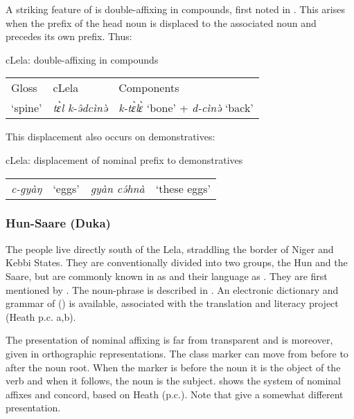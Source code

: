 \documentclass[output=paper]{langsci/langscibook}
\begin{document}
A striking feature of  is double-affixing in compounds, first noted in \citet{Hoffmann1967}. This arises when the prefix of the head noun is displaced to the associated noun and precedes its own prefix. Thus:

\ea
{cLela: double-affixing in compounds}\\
\begin{tabular}{lll}
{Gloss}	& {cLela}	& {Components}\\
‘spine’	& \textit{tɛ̀l k-ə̂dcìnə̀}	& \textit{k-tɛ̀lɛ̀} ‘bone’ + \textit{d-cìnə̀} ‘back’\\
\end{tabular}
\z

This displacement also occurs on demonstratives:

\ea
{cLela: displacement of nominal prefix to demonstratives}\\
\begin{tabular}{llll}
\textit{c-gyàŋ}	& ‘eggs’	& \textit{gyàn cə́hnà}	& ‘these eggs’\\
\end{tabular}
\z

\subsubsection{Hun-Saare (Duka)}

The  people live directly south of the Lela, straddling the border of Niger and Kebbi States. They are conventionally divided into two groups, the Hun and the Saare, but are commonly known in  as  and their language as  \citep{DettweilerDettweiler2003a}. They are first mentioned by \citet[96-100]{Temple1922}. The noun-phrase is described in \citet{Bendor-SamuelEtAl1973}. An electronic dictionary and grammar of  () is available, associated with the translation and literacy project (Heath p.c. a,b).

The presentation of  nominal affixing is far from transparent and is moreover, given in orthographic representations. The class marker can move from before to after the noun root. When the marker is before the noun it is the object of the verb and when it follows, the noun is the subject.  shows the system of  nominal affixes and concord, based on Heath (p.c.). Note that \citet{Bendor-SamuelEtAl1973} give a somewhat different presentation.
\end{document}
